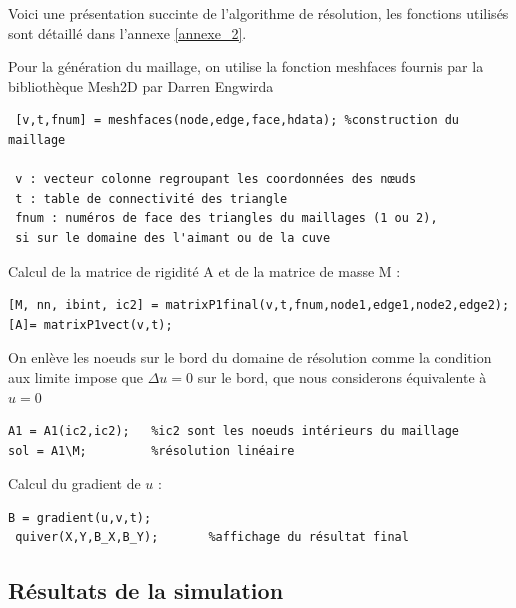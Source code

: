 \documentclass[a4paper,12pt,titlepage]{report}
\begin{document}
\begin{onehalfspace}
Voici une présentation succinte de l'algorithme de résolution, les fonctions utilisés sont détaillé dans l'annexe \ref{annexe_2}.

Pour la génération du maillage, on utilise la fonction meshfaces fournis par la bibliothèque Mesh2D par Darren Engwirda
\begin{verbatim}
 [v,t,fnum] = meshfaces(node,edge,face,hdata); %construction du maillage
 
 v : vecteur colonne regroupant les coordonnées des nœuds
 t : table de connectivité des triangle
 fnum : numéros de face des triangles du maillages (1 ou 2), 
 si sur le domaine des l'aimant ou de la cuve
\end{verbatim}
Calcul de la matrice de rigidité A et de la matrice de masse M : 
\begin{verbatim}
[M, nn, ibint, ic2] = matrixP1final(v,t,fnum,node1,edge1,node2,edge2);
[A]= matrixP1vect(v,t);
\end{verbatim}

On enlève les noeuds sur le bord du domaine de résolution comme la condition aux limite impose que $\Delta u = 0$ sur le bord, que nous considerons équivalente à $u = 0$ 
\begin{verbatim}
A1 = A1(ic2,ic2);	%ic2 sont les noeuds intérieurs du maillage
sol = A1\M;			%résolution linéaire
\end{verbatim}
Calcul du gradient de $u$ :
\begin{verbatim}
B = gradient(u,v,t);
 quiver(X,Y,B_X,B_Y);		%affichage du résultat final
\end{verbatim}

 
\subsection{Résultats de la simulation}


\end{onehalfspace}
\end{document}
